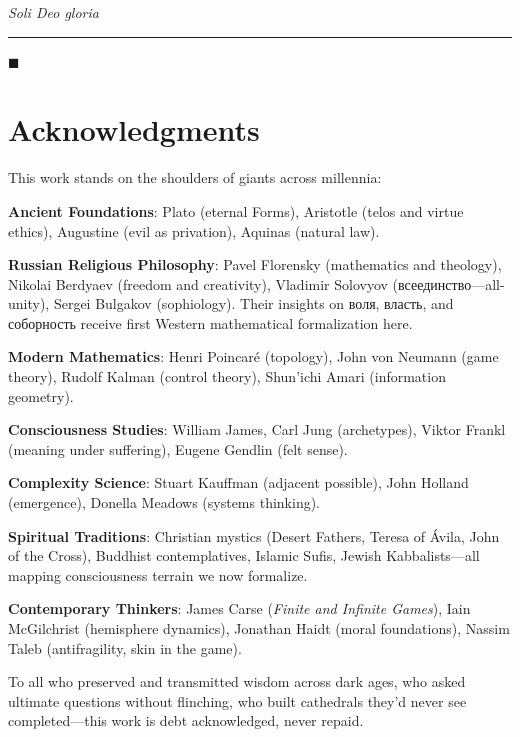 \documentclass[11pt,a4paper]{article}
\theoremstyle{definition}
\theoremstyle{remark}
\begin{document}
\begin{enumerate}
\begin{protocol}
\begin{center}
\vspace{0.5em}

\textit{Soli Deo gloria}

\vspace{0.5em}

\rule{0.6\linewidth}{0.5pt}
\end{center}

\begin{center}
\(\blacksquare\)
\end{center}

\vspace{2em}

\section*{Acknowledgments}

This work stands on the shoulders of giants across millennia:

\textbf{Ancient Foundations}: Plato (eternal Forms), Aristotle (telos and virtue ethics), Augustine (evil as privation), Aquinas (natural law).

\textbf{Russian Religious Philosophy}: Pavel Florensky (mathematics and theology), Nikolai Berdyaev (freedom and creativity), Vladimir Solovyov (всеединство—all-unity), Sergei Bulgakov (sophiology). Their insights on воля, власть, and соборность receive first Western mathematical formalization here.

\textbf{Modern Mathematics}: Henri Poincaré (topology), John von Neumann (game theory), Rudolf Kalman (control theory), Shun'ichi Amari (information geometry).

\textbf{Consciousness Studies}: William James, Carl Jung (archetypes), Viktor Frankl (meaning under suffering), Eugene Gendlin (felt sense).

\textbf{Complexity Science}: Stuart Kauffman (adjacent possible), John Holland (emergence), Donella Meadows (systems thinking).

\textbf{Spiritual Traditions}: Christian mystics (Desert Fathers, Teresa of Ávila, John of the Cross), Buddhist contemplatives, Islamic Sufis, Jewish Kabbalists—all mapping consciousness terrain we now formalize.

\textbf{Contemporary Thinkers}: James Carse (\textit{Finite and Infinite Games}), Iain McGilchrist (hemisphere dynamics), Jonathan Haidt (moral foundations), Nassim Taleb (antifragility, skin in the game).

To all who preserved and transmitted wisdom across dark ages, who asked ultimate questions without flinching, who built cathedrals they'd never see completed—this work is debt acknowledged, never repaid.


\end{protocol}
\end{enumerate}
\end{document}
